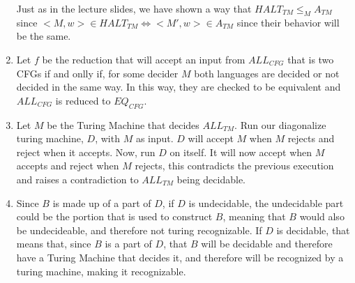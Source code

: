 \begin{enumerate}
    Just as in the lecture slides, we have shown a way that $HALT_{TM} \leq_M A_{TM}$ since $<M,w> \in HALT_{TM} \iff <M', w> \in A_{TM}$ since their behavior will be the same.

    \item Let $f$ be the reduction that will accept an input from $ALL_{CFG}$ that is two CFGs if and onlly if, for some decider $M$ both languages are decided or not decided in the same way. In this way, they are checked to be equivalent and $ALL_{CFG}$ is reduced to $EQ_{CFG}$.

    \item Let $M$ be the Turing Machine that decides $ALL_{TM}$. Run our diagonalize turing machine, $D$, with $M$ as input. $D$ will accept $M$ when $M$ rejects and reject when it accepts. Now, run $D$ on itself. It will now accept when $M$ accepts and reject when $M$ rejects, this contradicts the previous execution and raises a contradiction to $ALL_{TM}$ being decidable.

    \item Since $B$ is made up of a part of $D$, if $D$ is undecidable, the undecidable part could be the portion that is used to construct $B$, meaning that $B$ would also be undecideable, and therefore not turing recognizable. If $D$ is decidable, that means that, since $B$ is a part of $D$, that $B$ will be decidable and therefore have a Turing Machine that decides it, and therefore will be recognized by a turing machine, making it recognizable.
\end{enumerate}

